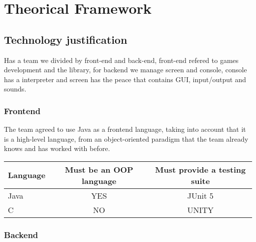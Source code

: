 \section{Theorical Framework}

\subsection{Technology justification}
Has a team we divided by front-end and back-end, front-end refered to games development and the library, for backend we manage screen and console, console has a interpreter and screen has the peace that contains GUI, input/output and sounds.

\subsubsection{Frontend}

The team agreed to use Java as a frontend language, taking into account that it is a high-level language, from an object-oriented paradigm that the team already knows and has worked with before.

\begin{tabular}{|l|c|c|}
\hline
Language & Must be an OOP language & Must provide a testing suite \\
\hline
Java & YES & JUnit 5 \\
\hline
C & NO & UNITY \\
\hline
\end{tabular}

\subsubsection{Backend}

